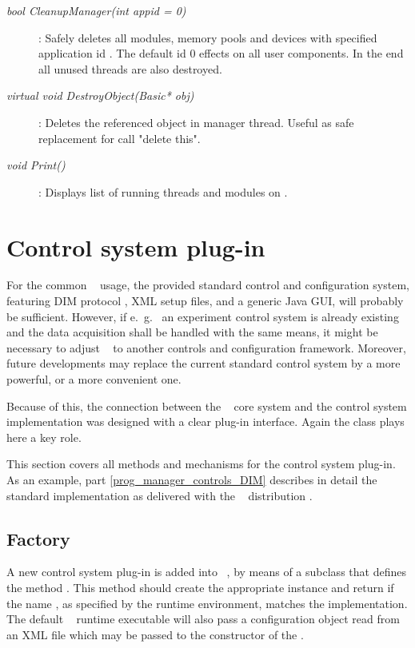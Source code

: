 \begin{description}	
 
\item[\em bool CleanupManager\small (int appid = 0) ] :
Safely deletes all modules, memory pools and devices with
specified application id . The default id 0 effects 
on all user components. In the end all unused threads are also 
destroyed. 
 
\item[\em virtual void DestroyObject\small (Basic* obj)] :
Deletes the referenced object  in manager thread.
Useful as safe replacement for call "delete this".

\item[\em void Print()] :
Displays list of running threads and modules on .


\end{description}




\section{Control system plug-in}
\label{prog_manager_controls}
For the common \dabc~ usage, the provided standard control and configuration system,
featuring DIM protocol \cite{DIM}, XML setup files, and a generic Java GUI,
will probably be sufficient.
However, if e.~g.~
an experiment control system is already existing and the data acquisition
shall be handled with the same means,
it might be necessary to adjust \dabc~ to another
controls and configuration framework.
Moreover, future developments may replace the current standard control
system by a more powerful, or a more convenient one.

Because of this, the connection between the \dabc~ core system and the
control system implementation was designed with a clear plug-in interface.
Again the  class plays here a key role.

This section covers all methods and mechanisms for
the control system plug-in. As an example, part \ref{prog_manager_controls_DIM}  
describes in detail the standard implementation as delivered with the \dabc~ distribution .



\subsection{Factory}
 \label{prog_manager_controls_factory}
A new control system plug-in is added into \dabc~, 
by means of a  subclass that  
defines the method
.
This method should
create the appropriate  instance and return  
if the name , as specified by the runtime environment,
matches the implementation.
The default \dabc~ runtime executable will also pass 
a configuration object  read from an XML file which may be
passed to the constructor of the .

